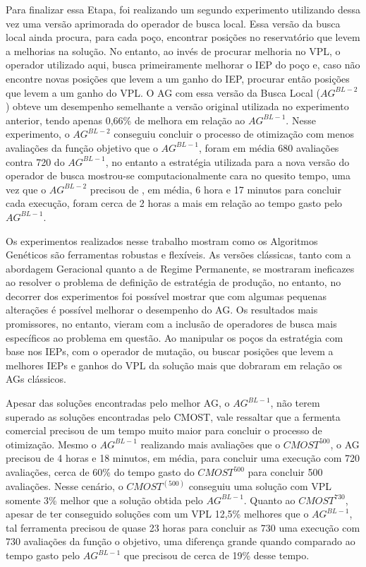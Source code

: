 Para finalizar essa Etapa, foi realizando um segundo experimento utilizando dessa vez uma versão aprimorada do operador de busca local. Essa versão da busca local ainda procura, para cada poço, encontrar posições no reservatório que levem a melhorias na solução. No entanto, ao invés de procurar melhoria no VPL, o operador utilizado aqui, busca primeiramente melhorar o IEP do poço e, caso não encontre novas posições que levem a um ganho do IEP, procurar então posições que levem a um ganho do VPL. O AG com essa versão da Busca Local ($AG^{BL-2}$) obteve um desempenho semelhante a versão original utilizada no experimento anterior, tendo apenas 0,66\% de melhora em relação ao $AG^{BL-1}$.  Nesse experimento, o $AG^{BL-2}$ conseguiu concluir o processo de otimização com menos avaliações da função objetivo que o $AG^{BL-1}$, foram em média 680 avaliações contra 720 do $AG^{BL-1}$, no entanto a estratégia utilizada para a nova versão do operador de busca mostrou-se computacionalmente cara no quesito tempo, uma vez que o $AG^{BL-2}$ precisou de , em média, 6 hora e 17 minutos para concluir cada execução, foram cerca de 2 horas a mais em relação ao tempo gasto pelo $AG^{BL-1}$.
 	
Os experimentos realizados nesse trabalho mostram como os Algoritmos Genéticos são ferramentas robustas e flexíveis. As versões clássicas, tanto com a abordagem Geracional quanto a de Regime Permanente, se mostraram ineficazes ao resolver o problema de definição de estratégia de produção, no entanto, no decorrer dos experimentos foi possível mostrar que com algumas pequenas alterações é possível melhorar o desempenho do AG. Os resultados mais promissores, no entanto, vieram com a inclusão de operadores de busca mais específicos ao problema em questão. Ao manipular os poços da estratégia com base nos IEPs, com o operador de mutação, ou buscar posições que levem a melhores IEPs e ganhos do VPL da solução mais que dobraram em relação os AGs clássicos.
 	
Apesar das soluções encontradas pelo melhor AG, o $AG^{BL-1}$, não terem superado as soluções encontradas pelo CMOST, vale ressaltar que a fermenta comercial precisou de um tempo muito maior para concluir o processo de otimização. Mesmo o $AG^{BL-1}$ realizando mais avaliações que o $CMOST^{500}$, o AG precisou de 4 horas e 18 minutos, em média, para concluir uma execução com 720 avaliações, cerca de 60\% do tempo gasto do $CMOST^{500}$ para concluir 500 avaliações. Nesse cenário, o $CMOST^(500)$ conseguiu uma solução com VPL somente 3\% melhor que a solução obtida pelo $AG^{BL-1}$. Quanto ao $CMOST^{730}$, apesar de ter conseguido soluções com um VPL 12,5\% melhores que o $AG^{BL-1}$, tal ferramenta precisou de quase 23 horas para concluir as 730 uma execução com 730 avaliações da função o objetivo, uma diferença grande quando comparado ao tempo gasto pelo $AG^{BL-1}$ que precisou de cerca de 19\% desse tempo.

